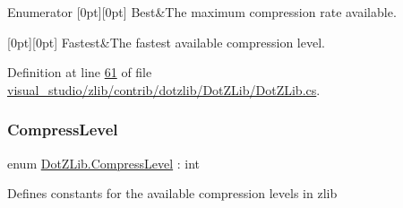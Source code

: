 \begin{DoxyEnumFields}{Enumerator}
[0pt][0pt]{}\mbox{\label{namespace_dot_z_lib_a034f7a1ef9856d8834e6f6b1c53d8a4ca68ef004de6166492c1d668eb8efe09bd}} 
Best&The maximum compression rate available. \\
\hline

[0pt][0pt]{}\mbox{\label{namespace_dot_z_lib_a034f7a1ef9856d8834e6f6b1c53d8a4ca90fd7fdf6f41406a75e5265b9583bb4e}} 
Fastest&The fastest available compression level. \\
\hline

\end{DoxyEnumFields}


Definition at line \hyperlink{visual__studio_2zlib_2contrib_2dotzlib_2_dot_z_lib_2_dot_z_lib_8cs_source_l00061}{61} of file \hyperlink{visual__studio_2zlib_2contrib_2dotzlib_2_dot_z_lib_2_dot_z_lib_8cs_source}{visual\+\_\+studio/zlib/contrib/dotzlib/\+Dot\+Z\+Lib/\+Dot\+Z\+Lib.\+cs}.

\mbox{\label{namespace_dot_z_lib_a034f7a1ef9856d8834e6f6b1c53d8a4c}} 
\subsubsection{\texorpdfstring{Compress\+Level}{CompressLevel}\hspace{0.1cm}{\footnotesize\ttfamily [2/2]}}
{\footnotesize\ttfamily enum \hyperlink{namespace_dot_z_lib_a034f7a1ef9856d8834e6f6b1c53d8a4c}{Dot\+Z\+Lib.\+Compress\+Level} \+: int\hspace{0.3cm}{\ttfamily [strong]}}



Defines constants for the available compression levels in zlib 

